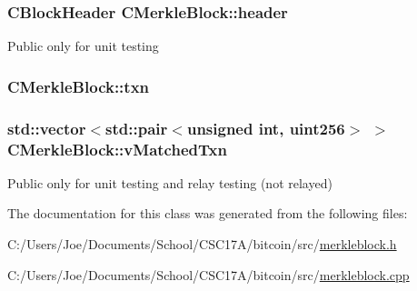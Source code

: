 \subsubsection[{header}]{\setlength{\rightskip}{0pt plus 5cm}C\+Block\+Header C\+Merkle\+Block\+::header}\label{class_c_merkle_block_a3c1fcef77eee1b476b3f3fd52055748a}
Public only for unit testing \hypertarget{class_c_merkle_block_ac2174e9e8ea6e429328deb5a69a05558}{}
\subsubsection[{txn}]{ C\+Merkle\+Block\+::txn}\label{class_c_merkle_block_ac2174e9e8ea6e429328deb5a69a05558}
\hypertarget{class_c_merkle_block_a73bbbdcb5d83588b15461c02d0228999}{}
\subsubsection[{v\+Matched\+Txn}]{\setlength{\rightskip}{0pt plus 5cm}std\+::vector$<$std\+::pair$<$unsigned int, {\bf uint256}$>$ $>$ C\+Merkle\+Block\+::v\+Matched\+Txn}\label{class_c_merkle_block_a73bbbdcb5d83588b15461c02d0228999}
Public only for unit testing and relay testing (not relayed) 

The documentation for this class was generated from the following files\+:\begin{DoxyCompactItemize}
\item 
C\+:/\+Users/\+Joe/\+Documents/\+School/\+C\+S\+C17\+A/bitcoin/src/\hyperlink{merkleblock_8h}{merkleblock.\+h}\item 
C\+:/\+Users/\+Joe/\+Documents/\+School/\+C\+S\+C17\+A/bitcoin/src/\hyperlink{merkleblock_8cpp}{merkleblock.\+cpp}\end{DoxyCompactItemize}
